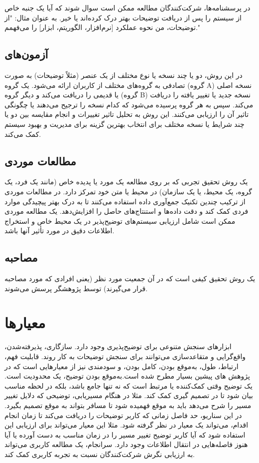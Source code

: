 در پرسشنامه‌ها، شرکت‌کنندگان مطالعه ممکن است سوال شوند که آیا یک جنبه خاص از
سیستم را پس از دریافت توضیحات بهتر درک کرده‌اند یا خیر. به عنوان مثال: "از
توضیحات، من نحوه عملکرد [نرم‌افزار، الگوریتم، ابزار] را می‌فهمم."

\subsection{آزمون‌های }

در این روش، دو یا چند نسخه یا نوع مختلف از یک عنصر (مثلاً توضیحات) به صورت
تصادفی به گروه‌های مختلف از کاربران ارائه می‌شود. یک گروه (گروه A) نسخه اصلی یا
قدیمی را دریافت می‌کند و دیگر گروه (گروه B) نسخه جدید یا تغییر یافته را دریافت
می‌کند. سپس به هر گروه پرسیده می‌شود که کدام نسخه را ترجیح می‌دهند یا چگونگی
تاثیر آن را ارزیابی می‌کنند. این روش به تحلیل تاثیر تغییرات و انجام مقایسه بین
دو یا چند شرایط یا نسخه مختلف برای انتخاب بهترین گزینه برای مدیریت و بهبود سیستم
کمک می‌کند.

\subsection{مطالعات موردی}

یک روش تحقیق تجربی که بر روی مطالعه یک مورد یا پدیده خاص (مانند یک فرد، یک گروه،
یک محیط، یا یک سازمان) در محیط یا متن خود تمرکز دارد. در مطالعات موردی از ترکیب
چندین تکنیک جمع‌آوری داده استفاده می‌کنند تا به درک بهتر پیچیدگی موارد فردی کمک
کند و دقت داده‌ها و استنتاج‌های حاصل را افزایش‌دهد. یک مطالعه موردی ممکن است
شامل ارزیابی سیستم‌های توضیح‌پذیر در یک محیط خاص و استخراج اطلاعات دقیق در مورد
تأثیر آنها باشد.

\subsection{مصاحبه}

یک روش تحقیق کیفی است که در آن جمعیت مورد نظر (یعنی افرادی که مورد مصاحبه قرار
می‌گیرند) توسط پژوهشگر پرسش می‌شوند.

\section{معیارها}

ابزارهای سنجش متنوعی برای توضیح‌پذیری وجود دارد. سازگاری، پذیرفته‌شدن،
واقع‌گرایی و متقاعدسازی می‌توانند برای سنجش توضیحات به کار روند. قابلیت فهم،
ارتباط، طول، به‌موقع بودن، کامل بودن، و سودمندی نیز از معیارهایی است که در پژوهش
های پیشین بسیار مطرح شده است.به‌موقع بودن توضیح، یک محدودیت است. یک توضیح وقتی
کمک‌کننده یا مرتبط است که نه تنها جامع باشد، بلکه در لحظه‌ مناسب بیان شود تا در
تصمیم گیری کمک کند. مثلا در هنگام مسیریابی، توضیحی که دلایل تغییر مسیر را شرح
می‌دهد باید به موقع فهمیده شود تا مسافر بتواند به موقع تصمیم بگیرد. در این
سناریو، حد فاصل زمانی که کاربر توضیحات را دریافت می‌کند تا زمان انجام اقدام،
می‌تواند یک معیار در نظر گرفته شود. مثلا این معیار می‌تواند برای ارزیابی این
استفاده شود که آیا کاربر توضیح تغییر مسیر را در زمان مناسب به دست آورده یا آیا
هنوز فاصله‌هایی در انتقال اطلاعات وجود دارد. سرانجام، یک مطالعه کاربری می‌تواند
به ارزیابی نگرش شرکت‌کنندگان نسبت به تجربه کاربری کمک کند. 


